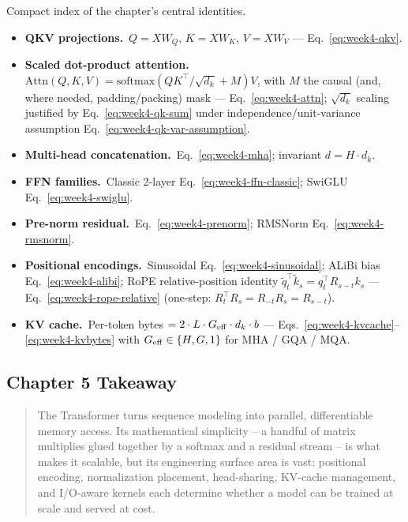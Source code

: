 \begin{derivledger}
Compact index of the chapter's central identities.
\begin{itemize}
  \item \textbf{QKV projections.}\
        $Q = X W_Q$, $K = X W_K$, $V = X W_V$
        --- Eq.~\eqref{eq:week4-qkv}.
  \item \textbf{Scaled dot-product attention.}\
        $\mathrm{Attn}(Q,K,V) = \mathrm{softmax}(QK^\top/\sqrt{d_k} + M)V$,
        with $M$ the causal (and, where needed, padding/packing)
        mask --- Eq.~\eqref{eq:week4-attn};
        $\sqrt{d_k}$ scaling justified by Eq.~\eqref{eq:week4-qk-sum}
        under independence/unit-variance assumption
        Eq.~\eqref{eq:week4-qk-var-assumption}.
  \item \textbf{Multi-head concatenation.}\
        Eq.~\eqref{eq:week4-mha}; invariant $d = H \cdot d_k$.
  \item \textbf{FFN families.}\
        Classic 2-layer Eq.~\eqref{eq:week4-ffn-classic};
        SwiGLU Eq.~\eqref{eq:week4-swiglu}.
  \item \textbf{Pre-norm residual.}\
        Eq.~\eqref{eq:week4-prenorm}; RMSNorm
        Eq.~\eqref{eq:week4-rmsnorm}.
  \item \textbf{Positional encodings.}\
        Sinusoidal Eq.~\eqref{eq:week4-sinusoidal};
        ALiBi bias Eq.~\eqref{eq:week4-alibi};
        RoPE relative-position identity
        $\tilde q_t^\top \tilde k_s = q_t^\top R_{s-t} k_s$
        --- Eq.~\eqref{eq:week4-rope-relative} (one-step:
        $R_t^\top R_s = R_{-t} R_s = R_{s-t}$).
  \item \textbf{KV cache.}\
        Per-token bytes $= 2 \cdot L \cdot G_{\rm eff} \cdot d_k \cdot b$
        --- Eqs.~\eqref{eq:week4-kvcache}--\eqref{eq:week4-kvbytes}
        with $G_{\rm eff} \in \{H, G, 1\}$ for MHA / GQA / MQA.
\end{itemize}
\end{derivledger}

\subsection{Chapter 5 Takeaway}

\begin{quote}
The Transformer turns sequence modeling into parallel, differentiable
memory access. Its mathematical simplicity -- a handful of matrix
multiplies glued together by a softmax and a residual stream -- is
what makes it scalable, but its engineering surface area is vast:
positional encoding, normalization placement, head-sharing, KV-cache
management, and I/O-aware kernels each determine whether a model can
be trained at scale and served at cost.
\end{quote}
